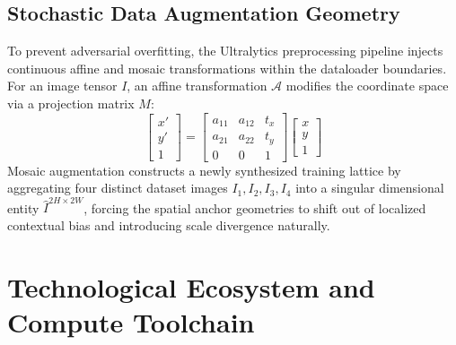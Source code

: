 \documentclass[11pt, letterpaper, oneside, openany]{book}
\begin{document}
\section{Stochastic Data Augmentation Geometry}
To prevent adversarial overfitting, the Ultralytics preprocessing pipeline injects continuous affine and mosaic transformations within the dataloader boundaries.
For an image tensor $I$, an affine transformation $\mathcal{A}$ modifies the coordinate space via a projection matrix $M$:
\begin{equation}
    \begin{bmatrix} x' \\ y' \\ 1 \end{bmatrix} = \begin{bmatrix} a_{11} & a_{12} & t_x \\ a_{21} & a_{22} & t_y \\ 0 & 0 & 1 \end{bmatrix} \begin{bmatrix} x \\ y \\ 1 \end{bmatrix}
\end{equation}
Mosaic augmentation constructs a newly synthesized training lattice by aggregating four distinct dataset images $I_1, I_2, I_3, I_4$ into a singular dimensional entity $\hat{I}^{2H \times 2W}$, forcing the spatial anchor geometries to shift out of localized contextual bias and introducing scale divergence naturally.

\chapter{Technological Ecosystem and Compute Toolchain}
\end{document}
